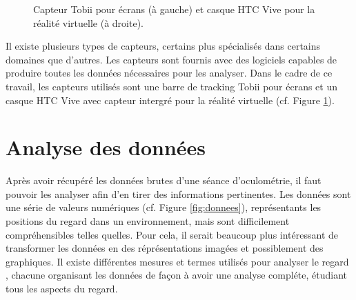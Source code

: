 \documentclass[hidelinks,12pt]{article}
\begin{document}
\begin{figure}[htpb]
  \centering
  \qquad
  \caption{Capteur Tobii \cite{img_tobii} pour écrans (à gauche) et casque HTC
    Vive \cite{img_htcvive} pour la réalité virtuelle (à droite).}
  \label{fig:materiel}
\end{figure}

Il existe plusieurs types de capteurs, certains plus spécialisés dans certains
domaines que d'autres. Les capteurs sont fournis avec des logiciels capables de
produire toutes les données nécessaires pour les analyser. Dans le cadre de ce
travail, les capteurs utilisés sont une barre de tracking Tobii pour écrans et
un casque HTC Vive avec capteur intergré pour la réalité virtuelle (cf. Figure
\ref{fig:materiel}).


\section{Analyse des données}

Après avoir récupéré les données brutes d'une séance d'oculométrie, il faut
pouvoir les analyser afin d'en tirer des informations pertinentes. Les
données sont une série de valeurs numériques (cf. Figure \ref{fig:donnees}),
représentants les positions du regard dans un environnement, mais sont
difficilement compréhensibles telles quelles. Pour cela, il serait beaucoup
plus intéressant de transformer les données en des réprésentations imagées et
possiblement des graphiques. Il existe différentes mesures et termes utilisés
pour analyser le regard \cite{imotions_metrics}, chacune organisant les données
de façon à avoir une analyse compléte, étudiant tous les aspects du regard.
\end{document}

